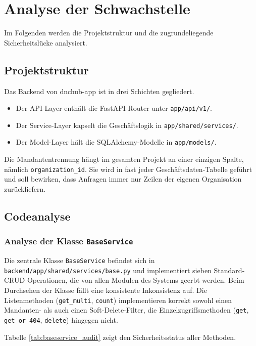 \section{Analyse der Schwachstelle}
\label{sec:analyse}
Im Folgenden werden die Projektstruktur und die zugrundeliegende Sicherheitslücke analysiert.

\subsection{Projektstruktur}

Das Backend von dnchub-app ist in drei Schichten gegliedert.

\begin{itemize}
    \item Der API-Layer enthält die FastAPI-Router unter \texttt{app/api/v1/}.
    \item Der Service-Layer kapselt die Geschäftslogik in \texttt{app/shared/services/}.
    \item Der Model-Layer hält die SQLAlchemy-Modelle in \texttt{app/models/}.
\end{itemize}

Die Mandantentrennung hängt im gesamten Projekt an einer einzigen Spalte,
nämlich \texttt{organization\_id}. Sie wird in fast jeder
Geschäftsdaten-Tabelle geführt und soll bewirken, dass Anfragen immer nur
Zeilen der eigenen Organisation zurückliefern.

\subsection{Codeanalyse}

\subsubsection{Analyse der Klasse \texttt{BaseService}}

Die zentrale Klasse \texttt{BaseService} befindet sich in
\texttt{backend/app/shared/services/base.py} und implementiert sieben
Standard-CRUD-Operationen, die von allen Modulen des Systems geerbt werden.
Beim Durchsehen der Klasse fällt eine konsistente Inkonsistenz auf. Die
Listenmethoden (\texttt{get\_multi}, \texttt{count}) implementieren korrekt
sowohl einen Mandanten- als auch einen Soft-Delete-Filter, die
Einzelzugriffsmethoden (\texttt{get}, \texttt{get\_or\_404}, \texttt{delete}) hingegen nicht.

Tabelle \ref{tab:baseservice_audit} zeigt den Sicherheitsstatus aller Methoden.

